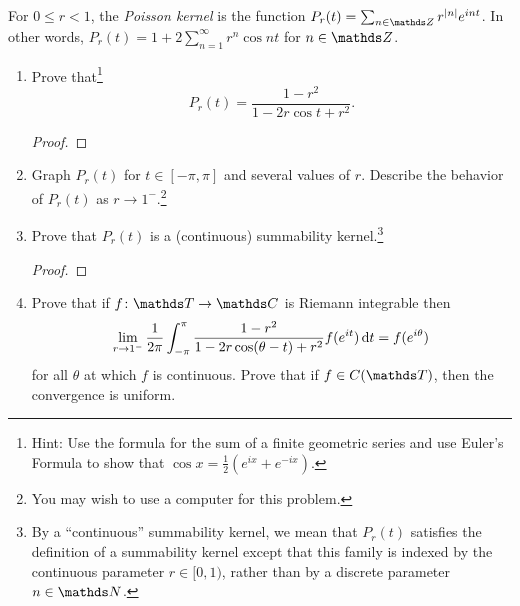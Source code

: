 \documentclass{../homework}
\begin{document}
\begin{Exercise}
  For \(0 \leq r < 1\), the \emph{Poisson kernel} is the function
  \(P_r(t) = \sum_{n \in \Z} r^{\abs n } e^{int}\).  In other words,
  \(P_r(t) = 1 + 2 \sum_{n=1}^{\infty} r^n \cos n t\) for
  \(n \in \Z\).
  \begin{enumerate}
  \item Prove that\footnote{Hint: Use the formula for the sum of a
      finite geometric series and use Euler's Formula to show that
      \(\cos x = \frac{1}{2} (e^{ix} + e^{-ix})\).}
    \begin{equation*}
      P_r(t) = \frac{1 - r^2}{1 - 2r \cos t + r^2}.
    \end{equation*}

    \begin{solution}
      \begin{proof}

      \end{proof}
    \end{solution}

  \item Graph \(P_r(t)\) for \(t \in [-\pi,\pi]\) and several values
    of \(r\).  Describe the behavior of \(P_r(t)\) as
    \(r \to 1^-\).\footnote{You may wish to use a computer for this
      problem.}

    \begin{solution}

    \end{solution}

  \item Prove that \(P_r(t)\) is a (continuous) summability
    kernel.\footnote{By a ``continuous'' summability kernel, we mean
      that \(P_r(t)\) satisfies the definition of a summability kernel
      except that this family is indexed by the continuous parameter
      \(r \in [0,1)\), rather than by a discrete parameter
      \(n \in \N\).}

    \begin{solution}
      \begin{proof}

      \end{proof}
    \end{solution}

  \item Prove that if \(f\colon \T\to\C\) is Riemann integrable then
    \begin{equation*}
      \lim_{r\to 1^-} \frac{1}{2\pi} \int_{-\pi}^{\pi}
      \frac{1 - r^2}{1 - 2r \cos (\theta - t) + r^2} f(e^{it}) \mathop{}\! \mathrm d t
      = f(e^{i \theta})
    \end{equation*}
    for all \(\theta\) at which \(f\) is continuous.  Prove that if
    \(f \in C(\T)\), then the convergence is uniform.


\end{enumerate}
\end{Exercise}
\end{document}

